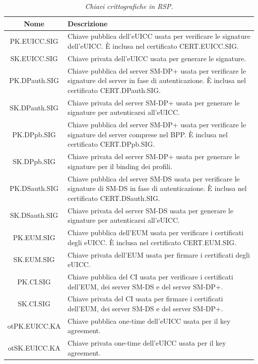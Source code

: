 \documentclass[10pt, oneside]{book}
\begin{document}
\begin{table}[h!]
\begin{center}
\captionsetup{skip=4pt}
\caption{\textit{Chiavi crittografiche in RSP.}}
\label{tab:keys}
\begin{tabularx}{\textwidth}{|c|X|}
\hline
\textbf{Nome} & \textbf{Descrizione}\\
\hline
PK.EUICC.SIG & Chiave pubblica dell'eUICC usata per verificare le signature dell'eUICC. È inclusa nel certificato CERT.EUICC.SIG.\\
\hline
SK.EUICC.SIG & Chiave privata dell'eUICC usata per generare le signature.\\
\hline
PK.DPauth.SIG & Chiave pubblica del server SM-DP+ usata per verificare le signature del server in fase di autenticazione. È inclusa nel certificato CERT.DPauth.SIG.\\
\hline
SK.DPauth.SIG & Chiave privata del server SM-DP+ usata per generare le signature per autenticarsi all'eUICC.\\
\hline
PK.DPpb.SIG & Chiave pubblica del server SM-DP+ usata per verificare le signature del server comprese nel BPP.  È inclusa nel certificato CERT.DPpb.SIG.\\
\hline
SK.DPpb.SIG & Chiave privata del server SM-DP+ usata per generare le signature per il binding dei profili.\\
\hline
PK.DSauth.SIG & Chiave pubblica del server SM-DS usata per verificare le signature di SM-DS in fase di autenticazione. È inclusa nel certificato CERT.DSauth.SIG.\\
\hline
SK.DSauth.SIG & Chiave privata del server SM-DS usata per generare le signature per autenticarsi all'eUICC.\\
\hline
PK.EUM.SIG & Chiave pubblica dell'EUM usata per verificare i certificati degli eUICC. È inclusa nel certificato CERT.EUM.SIG.\\
\hline
SK.EUM.SIG & Chiave privata dell'EUM usata per firmare i certificati degli eUICC.\\
\hline
PK.CI.SIG &  Chiave pubblica del CI usata per verificare i certificati dell'EUM, dei server SM-DS e del server SM-DP+.\\
\hline
SK.CI.SIG & Chiave privata del CI usata per firmare i certificati dell'EUM, dei server SM-DS e del server SM-DP+.\\
\hline
otPK.EUICC.KA & Chiave pubblica one-time dell'eUICC usata per il key agreement.\\
\hline
otSK.EUICC.KA & Chiave privata one-time dell'eUICC usata per il key agreement.\\

\end{tabularx}
\end{center}
\end{table}
\end{document}
